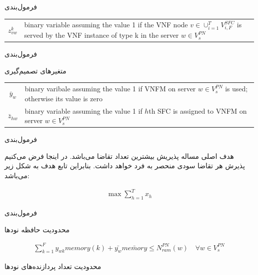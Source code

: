 \documentclass{beamer}
\begin{document}
\begin{persian}
\begin{frame}{فرمول‌بندی}
\begin{latin}
\begin{tabular}{c p{10cm}}
        $z^k_{vw}$ & binary variable assuming the value 1 if the VNF node $v \in \cup_{i=1}^{T} V_{i, F}^{SFC}$ is served by the VNF instance of type k in the server $w \in V_s^{PN}$ \\
    \end{tabular}\end{latin}
\end{frame}
\begin{frame}{فرمول‌بندی} %
    \par
    متغیرهای تصمیم‌گیری
    \begin{latin}\begin{tabular}{c p{10cm}}
        $\bar{y}_w$ & binary varibale assuming the value 1 if VNFM on server $w \in V_s^{PN}$ is used; otherwise its value is zero\\
        $\bar{z}_{hw}$ & binary variable assuming the value 1 if $h$th SFC is assigned to VNFM on server $w \in V_s^{PN}$\\
    \end{tabular}\end{latin}
\end{frame}
\begin{frame}{فرمول‌بندی} %
    \par
    هدف اصلی مساله پذیریش بیشترین تعداد تقاضا می‌باشد.
    در اینجا فرض می‌کنیم پذیرش هر تقاضا سودی منحصر به فرد خواهد داشت.
    بنابراین تابع هدف به شکل زیر می‌باشد:
    \begin{latin}\begin{align}
    \max \sum_{h=1}^T x_h
    \end{align}\end{latin}
\end{frame}
\begin{frame}{فرمول‌بندی} %
    \par
    محدودیت حافظه نودها
    \begin{latin}\begin{align}
    \sum_{k=1}^F y_{wk} memory(k) + \bar{y_w} \bar{memory} \le N_{ram}^{PN}(w)
    \quad
    \forall w \in V_s^{PN}
    \end{align}\end{latin}
    \par
    محدودیت تعداد پردازنده‌های نودها
    \begin{latin}\begin{align}

\end{align}
\end{latin}
\end{frame}
\end{persian}
\end{document}
